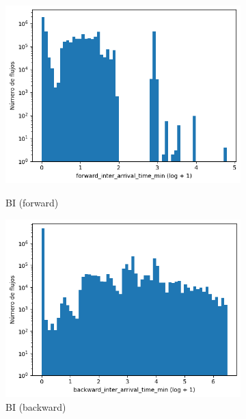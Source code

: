 \begin{figure}[H]
\begin{subfigure}[b]{0.26\textwidth}
        \includegraphics[width=\textwidth]{media/packet_pincer_botiot/forward_inter_arrival_time_min_log_x_log_y.png}
        \caption{BI (forward)}
        \includegraphics[width=\textwidth]{media/packet_pincer_botiot/backward_inter_arrival_time_min_log_x_log_y.png}
        \caption{BI (backward)} \label{fig:packet_pincer_inter_arrival_time_min_bi_min}
    \end{subfigure}
    \hfill
    \begin{subfigure}[b]{0.26\textwidth}
        \centering

\end{subfigure}
\end{figure}
